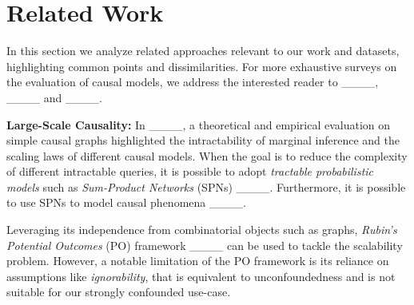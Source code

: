 \section{Related Work}
In this section we analyze related approaches relevant to our work and datasets, highlighting common points and dissimilarities. For more exhaustive surveys on the evaluation of causal models, we address the interested reader to ____, ____ and ____.

\textbf{Large-Scale Causality:} In ____, a theoretical and empirical evaluation on simple causal graphs highlighted the intractability of marginal inference and the scaling laws of different causal models. When the goal is to reduce the complexity of different intractable queries, it is possible to adopt \textit{tractable probabilistic models} such as \textit{Sum-Product Networks} (SPNs) ____. Furthermore, it is possible to use SPNs to model causal phenomena ____.

Leveraging its independence from combinatorial objects such as graphs, \textit{Rubin's Potential Outcomes} (PO) framework ____ can be used to tackle the scalability problem. However, a notable limitation of the PO framework is its reliance on assumptions like \textit{ignorability}, that is equivalent to unconfoundedness and is not suitable for our strongly confounded use-case.


